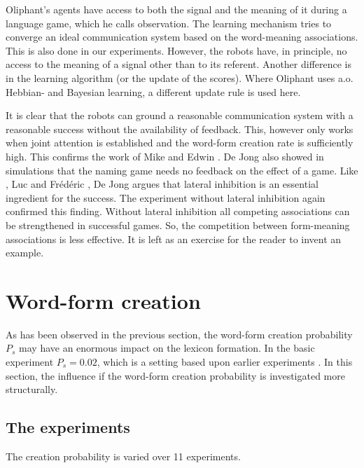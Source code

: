 Oliphant's agents have access to both the signal and the meaning of it during a language game, which he calls observation. The learning mechanism tries to converge an ideal communication system based on the word-meaning associations. This is also done in our experiments. However, the robots have, in principle, no access to the meaning of a signal other than to its referent. Another difference is in the learning algorithm (or the update of the scores). Where Oliphant uses a.o. Hebbian- and Bayesian learning, a different update rule is used here.

It is clear that the robots can ground a reasonable communication system with a reasonable success without the availability of feedback. This, however only works when joint attention is established and the word-form creation rate is sufficiently high. This confirms the work of Mike \citet{oliphant:1997} and Edwin \citet{dejong:2000}. De Jong also showed in simulations that the naming game needs no feedback on the effect of a game. Like \citet{oliphant:1997}, Luc \citet{steels:2000} and Fr\'ed\'eric \citet{kaplan:2000}, De Jong argues that lateral inhibition is an essential ingredient for the success. The experiment without lateral inhibition again confirmed this finding. Without lateral inhibition all competing associations can be strengthened in successful games. So, the competition between form-meaning associations is less effective. It is left as an exercise for the reader to invent an example.


\section{Word-form creation}\label{s:par:ps}

As has been observed in the previous section, the word-form creation probability $P_s$ may have an enormous impact on the lexicon formation. In the basic experiment $P_s=0.02$, which is a setting based upon earlier experiments \citep{vogt:1998b}. In this section, the influence if the word-form creation probability is investigated more structurally.

\subsection{The experiments}

The creation probability is varied over 11 experiments.

